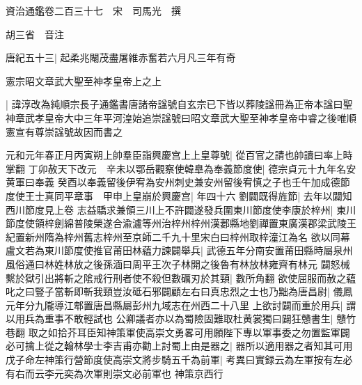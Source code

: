 資治通鑑卷二百三十七　宋　司馬光　撰

胡三省　音注

唐紀五十三|{
	起柔兆閹茂盡屠維赤奮若六月凡三年有奇}


憲宗昭文章武大聖至神孝皇帝上之上

|{
	諱淳改為純順宗長子通鑑書唐諸帝諡號自玄宗已下皆以葬陵諡冊為正帝本諡曰聖神章武孝皇帝大中三年平河湟始追崇諡號曰昭文章武大聖至神孝皇帝中睿之後唯順憲宣有尊崇諡號故因而書之}


元和元年春正月丙寅朔上帥羣臣詣興慶宫上上皇尊號|{
	從百官之請也帥讀曰率上時掌翻}
丁卯赦天下改元　辛未以鄂岳觀察使韓臯為奉義節度使|{
	德宗貞元十九年名安黄軍曰奉義}
癸酉以奉義留後伊宥為安州刺史兼安州留後宥慎之子也壬午加成德節度使王士真同平章事　甲申上皇崩於興慶宫|{
	年四十六}
劉闢既得旌節|{
	去年以闢知西川節度見上卷}
志益驕求兼領三川上不許闢遂發兵圍東川節度使李康於梓州|{
	東川節度使領梓劍綿普陵榮遂合渝瀘等州治梓州梓州漢郪縣地劉禪置東廣漢郡梁武陵王紀置新州隋為梓州舊志梓州至京師二千九十里宋白曰梓州取梓潼江為名}
欲以同幕盧文若為東川節度使推官莆田林藴力諫闢舉兵|{
	武德五年分南安置莆田縣時屬泉州風俗通曰林姓林放之後孫湎曰周平王次子林開之後魯有林放林雍齊有林元}
闢怒械繫於獄引出將斬之隂戒行刑者使不殺但數礪刃於其頸|{
	數所角翻}
欲使屈服而赦之藴叱之曰豎子當斬即斬我頸豈汝砥石邪闢顧左右曰真忠烈之士也乃黜為唐昌尉|{
	儀鳳元年分九隴導江郫置唐昌縣屬彭州九域志在州西二十八里}
上欲討闢而重於用兵|{
	謂以用兵為重事不敢輕試也}
公卿議者亦以為蜀險固難取杜黄裳獨曰闢狂戇書生|{
	戇竹巷翻}
取之如拾芥耳臣知神策軍使高崇文勇畧可用願陛下專以軍事委之勿置監軍闢必可擒上從之翰林學士李吉甫亦勸上討蜀上由是器之|{
	器所以適用器之者知其可用}
戊子命左神策行營節度使高崇文將步騎五千為前軍|{
	考異曰實録云為左軍按有左必有右而云李元奕為次軍則崇文必前軍也}
神策京西行

